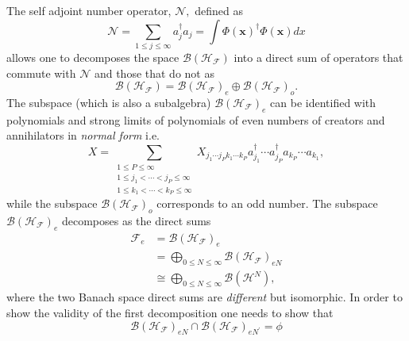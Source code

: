 \documentclass[aps,preprint]{revtex4}%
\begin{document}
The self adjoint number operator, $\mathcal{N},$ defined as
\begin{equation}
\mathcal{N=}\sum_{1\leq j\leq\infty}a_{j}^{\dagger}a_{j}=\int\Phi\left(
\boldsymbol{x}\right)  ^{\dagger}\Phi\left(  \boldsymbol{x}\right)  dx
\end{equation}
allows one to decomposes the space $\mathcal{B}\left(  \mathcal{H}%
_{\mathcal{F}}\right)  $ into a direct sum of operators that commute with
$\mathcal{N}$ and those that do not as
\begin{equation}
\mathcal{B}\left(  \mathcal{H}_{\mathcal{F}}\right)  =\mathcal{B}\left(
\mathcal{H}_{\mathcal{F}}\right)  _{e}\oplus\mathcal{B}\left(  \mathcal{H}%
_{\mathcal{F}}\right)  _{o}.
\end{equation}
The subspace (which is also a subalgebra) $\mathcal{B}\left(  \mathcal{H}%
_{\mathcal{F}}\right)  _{e}$ can be identified with polynomials and strong
limits of polynomials of even numbers of creators and annihilators in
\emph{normal form} i.e.%
\begin{equation}
X=\sum_{\substack{1\leq P\leq\infty\\1\leq j_{1}<\cdots<j_{P}\leq\infty\\1\leq
k_{1}<\cdots<k_{P}\leq\infty}}X_{j_{1}\cdots j_{P}k_{1}\cdots k_{P}}a_{j_{1}%
}^{\dagger}\cdots a_{j_{P}}^{\dagger}a_{k_{P}}\cdots a_{k_{1}},
\end{equation}
while the subspace $\mathcal{B}\left(  \mathcal{H}_{\mathcal{F}}\right)  _{o}$
corresponds to an odd number. The subspace $\mathcal{B}\left(  \mathcal{H}%
_{\mathcal{F}}\right)  _{e}$ decomposes as the direct sums
\begin{align}
\mathcal{F}_{e} &  =\mathcal{B}\left(  \mathcal{H}_{\mathcal{F}}\right)
_{e}\nonumber\\
&  =%
{\displaystyle\bigoplus\limits_{0\leq N\leq\infty}}
\mathcal{B}\left(  \mathcal{H}_{\mathcal{F}}\right)  _{eN}\label{BanSp}\\
&  \cong%
{\displaystyle\bigoplus\limits_{0\leq N\leq\infty}}
\mathcal{B}\left(  \mathcal{H}^{N}\right)  ,\label{BanAlg}%
\end{align}
where the two Banach space direct sums are \emph{different} but isomorphic. In
order to show the validity of the first decomposition one needs to show that
\begin{equation}
\mathcal{B}\left(  \mathcal{H}_{\mathcal{F}}\right)  _{eN}\cap\mathcal{B}%
\left(  \mathcal{H}_{\mathcal{F}}\right)  _{eN^{\prime}}=\phi
\end{equation}
\end{document}
